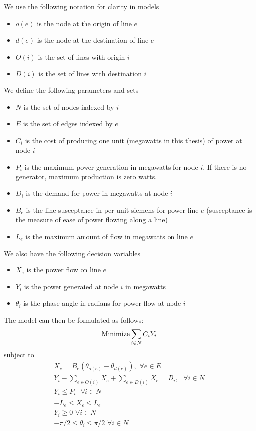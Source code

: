 \documentclass{article}
\begin{document}
		
		We use the following notation for clarity in models
	\begin{itemize}
		\item $o(e)$ is the node at the origin of line $e$ 
		\item $d(e)$ is the node at the destination of line $e$
		\item $O(i)$ is the set of lines with origin $i$
		\item $D(i)$ is the set of lines with destination $i$
	\end{itemize}
	We define the following parameters and sets
	\begin{itemize}
		\item $N$ is the set of nodes indexed by $i$
		\item $E$ is the set of edges indexed by $e$
		\item $C_i$ is the cost of producing one unit (megawatts in this thesis) of power at node $i$
		\item $P_i$ is the maximum power generation in megawatts for node $i$. If there is no generator, maximum production is zero watts.
		\item $D_i$ is the demand for power in megawatts at node $i$
		\item $B_e$ is the line susceptance in per unit siemens for power line $e$ (susceptance is the measure of ease of power flowing along a line)
		\item $\overline{L_e}$ is the maximum amount of flow in megawatts on line $e$
	
	\end{itemize}
	We also have the following decision variables
	\begin{itemize}
	\item $X_e$ is the power flow on line $e$ 
	\item $Y_i$ is the power generated at node $i$ in megawatts
	\item $\theta_i$ is the phase angle in radians for power flow at node $i$ 
	\end{itemize}
	The model can then be formulated as follows: 
	\begin{equation}
\textnormal{Minimize} \sum_{i\in N} C_i Y_i
	\end{equation} 
	subject to
	\begin{eqnarray}
	X_e = B_e (\theta_{o(e)} - \theta_{d(e)}), \hspace{4pt} \forall e \in E\\
	Y_i - \sum_{e \in O(i)} X_e + \sum_{e \in D(i)} X_e = D_i, \hspace{4pt} \hspace{4pt} \forall i \in N\\
	  Y_i \leq P_{i} \hspace{4pt} \hspace{4pt} \forall i \in N	\\ 
	  -\overline{L_e} \leq X_e \leq \overline{L_e}\\
	  Y_i \geq 0 \hspace{4pt} \forall i \in N\\
	  -\pi/2 \leq \theta_i \leq \pi/2 \hspace{4pt} \forall i \in N
\end{eqnarray}
\end{document}
